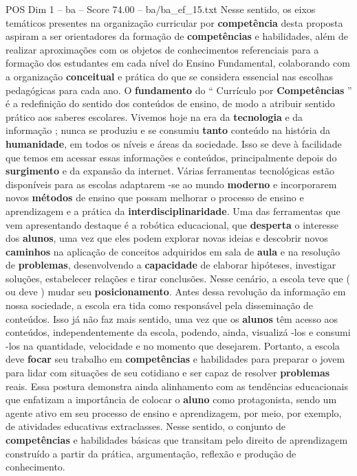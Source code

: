\begin{textsample}{POS Dim 1 – ba – Score 74.00 – ba/ba\_ef\_15.txt}
Nesse sentido, os eixos temáticos presentes na organização curricular por \textbf{competência} desta proposta aspiram a ser orientadores da formação de \textbf{competências} e habilidades, além de realizar aproximações com os objetos de conhecimentos referenciais para a formação dos estudantes em cada nível do Ensino Fundamental, colaborando com a organização \textbf{conceitual} e prática do que se considera essencial nas escolhas pedagógicas para cada ano.
O \textbf{fundamento} do “ Currículo por \textbf{Competências} ” é a redefinição do sentido dos conteúdos de ensino, de modo a atribuir sentido prático aos saberes escolares.
Vivemos hoje na era da \textbf{tecnologia} e da informação ; nunca se produziu e se consumiu \textbf{tanto} conteúdo na história da \textbf{humanidade}, em todos os níveis e áreas da sociedade.
Isso se deve à facilidade que temos em acessar essas informações e conteúdos, principalmente depois do \textbf{surgimento} e da expansão da internet.
Várias ferramentas tecnológicas estão disponíveis para as escolas adaptarem -se ao mundo \textbf{moderno} e incorporarem novos \textbf{métodos} de ensino que possam melhorar o processo de ensino e aprendizagem e a prática da \textbf{interdisciplinaridade}.
Uma das ferramentas que vem apresentando destaque é a robótica educacional, que \textbf{desperta} o interesse dos \textbf{alunos}, uma vez que eles podem explorar novas ideias e descobrir novos \textbf{caminhos} na aplicação de conceitos adquiridos em sala de \textbf{aula} e na resolução de \textbf{problemas}, desenvolvendo a \textbf{capacidade} de elaborar hipóteses, investigar soluções, estabelecer relações e tirar conclusões.
Nesse cenário, a escola teve que ( ou deve ) mudar seu \textbf{posicionamento}.
Antes dessa revolução da informação em nossa sociedade, a escola era tida como responsável pela disseminação de conteúdos.
Isso já não faz mais sentido, uma vez que os \textbf{alunos} têm acesso aos conteúdos, independentemente da escola, podendo, ainda, visualizá -los e consumi -los na quantidade, velocidade e no momento que desejarem.
Portanto, a escola deve \textbf{focar} seu trabalho em \textbf{competências} e habilidades para preparar o jovem para lidar com situações de seu cotidiano e ser capaz de resolver \textbf{problemas} reais.
Essa postura demonstra ainda alinhamento com as tendências educacionais que enfatizam a importância de colocar o \textbf{aluno} como protagonista, sendo um agente ativo em seu processo de ensino e aprendizagem, por meio, por exemplo, de atividades educativas extraclasses.
Nesse sentido, o conjunto de \textbf{competências} e habilidades básicas que transitam pelo direito de aprendizagem construído a partir da prática, argumentação, reflexão e produção de conhecimento.

\end{textsample}
